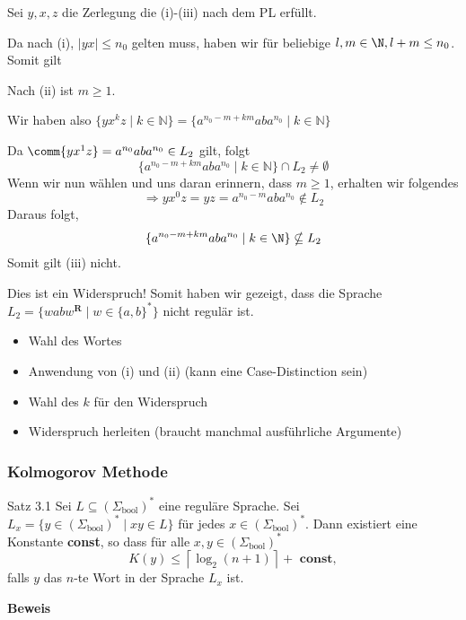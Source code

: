     Sei \(y, x, z\) die Zerlegung die (i)-(iii) nach dem PL erfüllt.

Da nach (i), $|yx| \leq n_0$ gelten muss, haben wir  für beliebige $l,m \in \N, l+m \leq n_0$. 
\newline 
Somit gilt 

Nach (ii) ist $m \geq 1$. 

Wir haben also $\{yx^kz \mid k \in \mathbb{N} \} = \{a^{n_0-m+km}aba^{n_0} \mid k \in \mathbb{N} \}$

    Da $\comm{yx^1z} = a^{n_0}aba^{n_0} \in L_2$ gilt, folgt 
$$\{a^{n_0-m+km}aba^{n_0} \mid k \in \mathbb{N} \}  \cap L_2 \neq \emptyset$$
Wenn wir nun  wählen und uns daran erinnern, dass $m \geq 1$, erhalten wir folgendes
$$\Rightarrow yx^0z = yz = a^{n_0-m}aba^{n_0} \notin L_2$$
Daraus folgt,
$$\{a^{n_0-m+km}aba^{n_0} \mid k \in \N \} \nsubseteq L_2$$
Somit gilt (iii) nicht.

Dies ist ein Widerspruch! Somit haben wir gezeigt, dass die Sprache $L_2 = \{wabw^{\textbf{R}} \mid w \in \{a,b\}^*\}$ nicht regulär ist.

\begin{itemize}
    \item Wahl des Wortes
    \item Anwendung von (i) und (ii) (kann eine Case-Distinction sein)
    \item Wahl des \(k\) für den Widerspruch
    \item Widerspruch herleiten (braucht manchmal ausführliche Argumente)
\end{itemize}


    \subsubsection{Kolmogorov Methode}
    \begin{mainbox}{Satz 3.1}
        Sei $L \subseteq (\Sigma_{\text{bool}})^*$ eine reguläre Sprache. Sei $L_x = \{y \in (\Sigma_{\text{bool}})^* \mid xy \in L\}$ für jedes $x\in (\Sigma_{\text{bool}})^*$. Dann existiert eine Konstante \textbf{const}, so dass für alle $x, y \in (\Sigma_\text{bool})^*$
        $$K(y) \leq \left\lceil \log_2(n+1)\right\rceil + \textbf{ const},$$
        falls $y$ das $n$-te Wort in der Sprache $L_x$ ist.
    \end{mainbox}
    \textbf{Beweis} 


